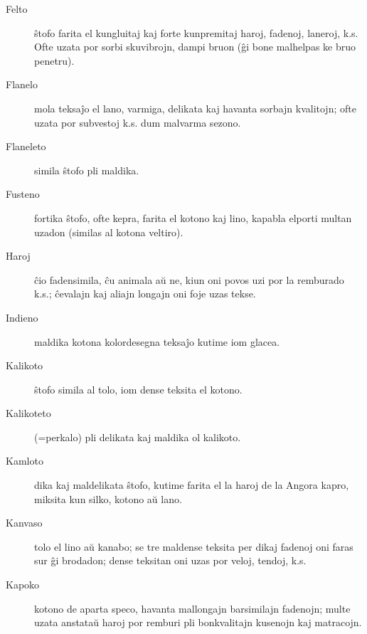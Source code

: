 \begin{description}
\item[Felto]

 ŝtofo farita el kungluitaj kaj forte kunpremitaj haroj, fadenoj, laneroj, k.s. Ofte uzata por sorbi skuvibrojn, dampi bruon (ĝi bone malhelpas ke bruo penetru).

\item[Flanelo]

 mola teksaĵo el lano, varmiga, delikata kaj havanta sorbajn kvalitojn; ofte uzata por subvestoj k.s. dum malvarma sezono.

\item[Flaneleto]

 simila ŝtofo pli maldika.

\item[Fusteno]

 fortika ŝtofo, ofte kepra, farita el kotono kaj lino, kapabla elporti multan uzadon (similas al kotona veltiro).

\item[Haroj]

 ĉio fadensimila, ĉu animala aŭ ne, kiun oni povos uzi por la remburado k.s.; ĉevalajn kaj aliajn longajn oni foje uzas tekse.

\item[Indieno]

 maldika kotona kolordesegna teksaĵo kutime iom glacea.

\item[Kalikoto]

 ŝtofo simila al tolo, iom dense teksita el kotono.

\item[Kalikoteto]

 (=perkalo) pli delikata kaj maldika ol kalikoto.

\item[Kamloto]

 dika kaj maldelikata ŝtofo, kutime farita el la haroj de la Angora kapro, miksita kun silko, kotono aŭ lano.

\item[Kanvaso]

 tolo el lino aŭ kanabo; se tre maldense teksita per dikaj fadenoj oni faras sur ĝi brodadon; dense teksitan oni uzas por veloj, tendoj, k.s.

\item[Kapoko]

 kotono de aparta speco, havanta mallongajn barsimilajn fadenojn; multe uzata anstataŭ haroj por remburi pli bonkvalitajn kusenojn kaj matracojn.


\end{description}
